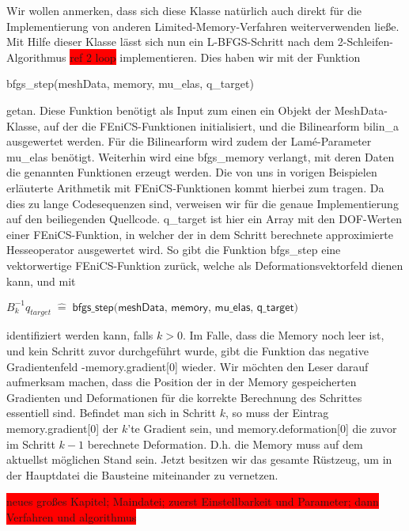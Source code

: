 \documentclass[bibliography=totoc,12pt,a4paper]{scrartcl}
\theoremstyle{exampstyle}
\numberwithin{equation}{section}
\begin{document}
Wir wollen anmerken, dass sich diese Klasse natürlich auch direkt für die Implementierung von anderen Limited-Memory-Verfahren weiterverwenden ließe. 
Mit Hilfe dieser Klasse lässt sich nun ein L-BFGS-Schritt nach dem 2-Schleifen-Algorithmus \colorbox{red}{ref 2 loop} implementieren. Dies haben wir mit der Funktion 
\begin{center}
\textsf{bfgs\_step(meshData, memory, mu\_elas, q\_target)}
\end{center} getan. Diese Funktion benötigt als Input zum einen ein Objekt der  \textsf{MeshData}-Klasse, auf der die FEniCS-Funktionen initialisiert, und die Bilinearform \textsf{bilin\_a} ausgewertet werden. Für die Bilinearform wird zudem der Lamé-Parameter \textsf{mu\_elas} benötigt. Weiterhin wird eine \textsf{bfgs\_memory} verlangt, mit deren Daten die genannten Funktionen erzeugt werden. Die von uns in vorigen Beispielen erläuterte Arithmetik mit FEniCS-Funktionen kommt hierbei zum tragen. Da dies zu lange Codesequenzen sind, verweisen wir für die genaue Implementierung auf den beiliegenden Quellcode. \textsf{q\_target} ist hier ein Array mit den DOF-Werten einer FEniCS-Funktion, in welcher der in dem Schritt berechnete approximierte Hesseoperator ausgewertet wird. So gibt die Funktion \textsf{bfgs\_step} eine vektorwertige FEniCS-Funktion zurück, welche als Deformationsvektorfeld dienen kann, und mit
\begin{center}
	$B_k^{-1} q_{target} \; \hat{=} \; \textsf{bfgs\_step(meshData, memory, mu\_elas, q\_target)}$
\end{center}
identifiziert werden kann, falls $k>0$. Im Falle, dass die Memory noch leer ist, und kein Schritt zuvor durchgeführt wurde, gibt die Funktion das negative Gradientenfeld \textsf{-memory.gradient[0]} wieder. Wir möchten den Leser darauf aufmerksam machen, dass die Position der in der Memory gespeicherten Gradienten und Deformationen für die korrekte Berechnung des Schrittes essentiell sind. Befindet man sich in Schritt $k$, so muss der Eintrag \textsf{memory.gradient[0]} der $k$'te Gradient sein, und \textsf{memory.deformation[0]} die zuvor im Schritt $k-1$ berechnete Deformation. D.h. die Memory muss auf dem aktuellst möglichen Stand sein. Jetzt besitzen wir das gesamte Rüstzeug, um in der Hauptdatei die Bausteine miteinander zu vernetzen.

\colorbox{red}{neues großes Kapitel; Maindatei; zuerst Einstellbarkeit und Parameter; dann Verfahren und algorithmus}
\end{document}
